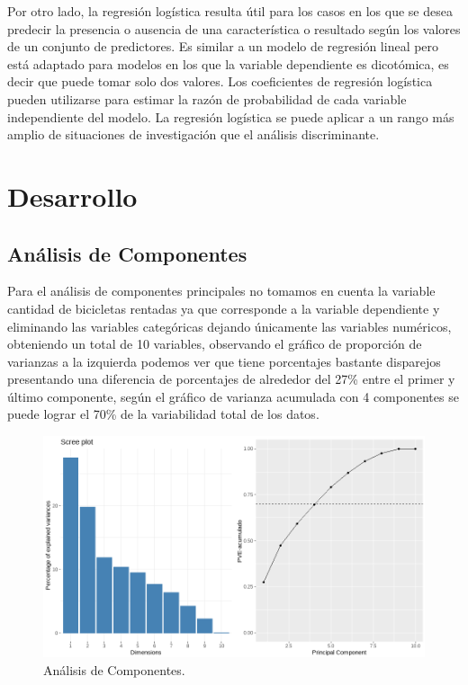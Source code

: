 \documentclass[]{elsarticle} %
\begin{document}
Por otro lado, la regresión logística resulta útil para los casos en los
que se desea predecir la presencia o ausencia de una característica o
resultado según los valores de un conjunto de predictores. Es similar a
un modelo de regresión lineal pero está adaptado para modelos en los que
la variable dependiente es dicotómica, es decir que puede tomar solo dos
valores. Los coeficientes de regresión logística pueden utilizarse para
estimar la razón de probabilidad de cada variable independiente del
modelo. La regresión logística se puede aplicar a un rango más amplio de
situaciones de investigación que el análisis discriminante.

\newpage
\section{Desarrollo}
\subsection{Análisis de Componentes}

Para el análisis de componentes principales no tomamos en cuenta la
variable cantidad de bicicletas rentadas ya que corresponde a la
variable dependiente y eliminando las variables categóricas dejando
únicamente las variables numéricos, obteniendo un total de 10 variables,
observando el gráfico de proporción de varianzas a la izquierda podemos
ver que tiene porcentajes bastante disparejos presentando una diferencia
de porcentajes de alrededor del 27\% entre el primer y último
componente, según el gráfico de varianza acumulada con 4 componentes se
puede lograr el 70\% de la variabilidad total de los datos.

\begin{figure}[H]

{\centering \includegraphics[width=1\linewidth]{cp1} 

}

\caption{\label{fig:fig1}Análisis de Componentes.}\label{fig:fig1}
\end{figure}
\end{document}
